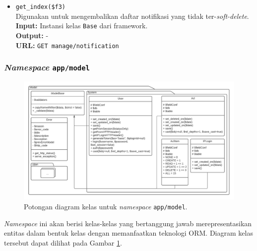 \begin{itemize}
\begin{itemize}
                \item \texttt{get\_index(\$f3)} \\
                    Digunakan untuk mengembalikan daftar notifikasi yang tidak
                    ter-\textit{soft-delete}.\\
                    \textbf{Input:} Instansi kelas \texttt{Base} dari
                    framework.\\
                    \textbf{Output:} -\\
                    \textbf{URL:} \texttt{GET manage/notification}

            \end{itemize}
    \end{itemize}

\subsubsection{\textit{Namespace} \texttt{app/model}}
    \begin{figure}
        \centering
        \includegraphics[width=0.8\paperheight]{Gambar/classmap-be/Classmap - app-model.pdf}
        \caption{Potongan diagram kelas untuk \textit{namespace}
        \texttt{app/model}.}
        \label{fig:classmap_app-model}
    \end{figure}
    \textit{Namespace} ini akan berisi kelas-kelas yang bertanggung jawab
    merepresentasikan entitas dalam bentuk kelas dengan memanfaatkan teknologi
    ORM. Diagram kelas tersebut dapat dilihat pada Gambar
    \ref{fig:classmap_app-model}.
    
